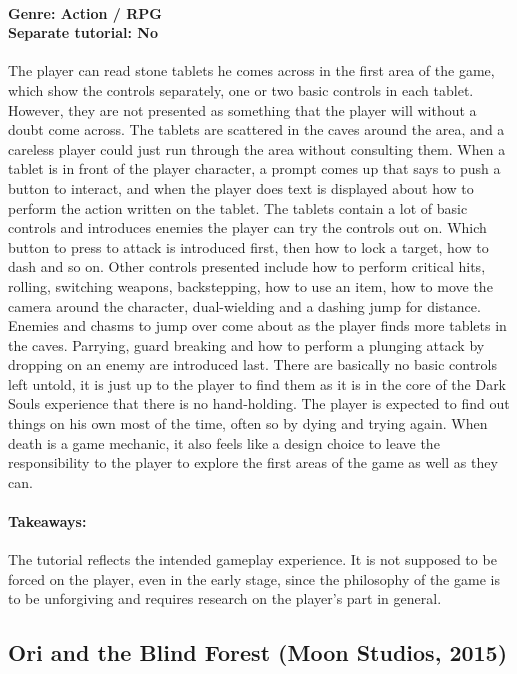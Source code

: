 \paragraph{Genre: Action / RPG \\ Separate tutorial: No \\}
The player can read stone tablets he comes across in the first area of the game, which show the controls separately, one or two basic controls in each tablet. However, they are not presented as something that the player will without a doubt come across. The tablets are scattered in the caves around the area, and a careless player could just run through the area without consulting them. When a tablet is in front of the player character, a prompt comes up that says to push a button to interact, and when the player does text is displayed about how to perform the action written on the tablet. The tablets contain a lot of basic controls and introduces enemies the player can try the controls out on. Which button to press to attack is introduced first, then how to lock a target, how to dash and so on. Other controls presented include how to perform critical hits, rolling, switching weapons, backstepping, how to use an item, how to move the camera around the character, dual-wielding and a dashing jump for distance. Enemies and chasms to jump over come about as the player finds more tablets in the caves. Parrying, guard breaking and how to perform a plunging attack by dropping on an enemy are introduced last. There are basically no basic controls left untold, it is just up to the player to find them as it is in the core of the Dark Souls experience that there is no hand-holding. The player is expected to find out things on his own most of the time, often so by dying and trying again. When death is a game mechanic, it also feels like a design choice to leave the responsibility to the player to explore the first areas of the game as well as they can.
\paragraph{Takeaways:}
The tutorial reflects the intended gameplay experience. It is not supposed to be forced on the player, even in the early stage, since the philosophy of the game is to be unforgiving and requires research on the player's part in general. 

\subsection{Ori and the Blind Forest (Moon Studios, 2015)}
